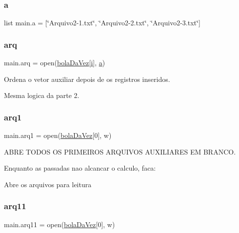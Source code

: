 \subsubsection{\texorpdfstring{a}{a}}
{\footnotesize\ttfamily list main.\+a = \mbox{[}\char`\"{}Arquivo2-\/1.txt\char`\"{}, \char`\"{}Arquivo2-\/2.txt\char`\"{}, \char`\"{}Arquivo2-\/3.txt\char`\"{}\mbox{]}}

\mbox{\label{namespacemain_a5bf6c828ddc1cb2c35f0633f52b44f91}} 
\subsubsection{\texorpdfstring{arq}{arq}}
{\footnotesize\ttfamily main.\+arq = open(\hyperlink{namespacemain_a1a062cd836b3711b8674874524bf97dc}{bola\+Da\+Vez}\mbox{[}\hyperlink{namespacemain_ade6e2febf33b88a767c2e85902add210}{i}\mbox{]}, \textquotesingle{}\hyperlink{namespacemain_aa164244f9ef98d3941710f56dae766dc}{a}\textquotesingle{})}



Ordena o vetor auxiliar depois de os registros inseridos. 

Mesma logica da parte 2. \mbox{\label{namespacemain_acce0df181fcd17c6c85677bd759fc702}} 
\subsubsection{\texorpdfstring{arq1}{arq1}}
{\footnotesize\ttfamily main.\+arq1 = open(\hyperlink{namespacemain_a1a062cd836b3711b8674874524bf97dc}{bola\+Da\+Vez}\mbox{[}0\mbox{]}, \textquotesingle{}w\textquotesingle{})}



A\+B\+RE T\+O\+D\+OS OS P\+R\+I\+M\+E\+I\+R\+OS A\+R\+Q\+U\+I\+V\+OS A\+U\+X\+I\+L\+I\+A\+R\+ES EM B\+R\+A\+N\+CO. 

Enquanto as passadas nao alcancar o calculo, faca\+:

Abre os arquivos para leitura \mbox{\label{namespacemain_a1a1dd2c22f8dc7b2f0a4f2f59d2b19c0}} 
\subsubsection{\texorpdfstring{arq11}{arq11}}
{\footnotesize\ttfamily main.\+arq11 = open(\hyperlink{namespacemain_a1a062cd836b3711b8674874524bf97dc}{bola\+Da\+Vez}\mbox{[}0\mbox{]}, \textquotesingle{}w\textquotesingle{})}



